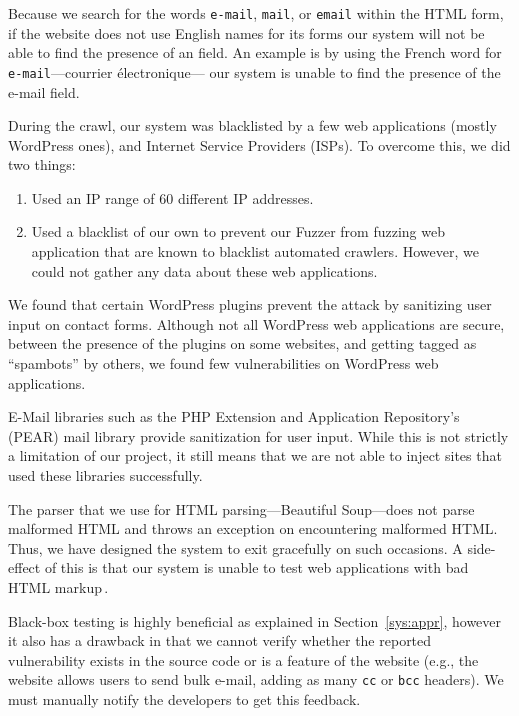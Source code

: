         Because we search for the words \texttt{e-mail}, \texttt{mail}, or \texttt{email} within the HTML form, if the website does not use English names for its forms our system will not be able to find the presence of an \email field. An example is by using the French word for \texttt{e-mail}---courrier {{\'e}}lectronique--- our system is unable to find the presence of the e-mail field. 
        
		During the crawl, our system was blacklisted by a few web applications (mostly WordPress ones), and Internet Service Providers (ISPs).
		To overcome this, we did two things:
		\begin{enumerate}
			\item Used an IP range of 60 different IP addresses.
			\item Used a blacklist of our own to prevent our Fuzzer from fuzzing web application that are known to blacklist automated crawlers.  However, we could not gather any data about these web applications.
		\end{enumerate}

		We found that certain WordPress plugins prevent the \ehi attack by sanitizing user input on contact forms. Although not all  WordPress web applications are secure, between the presence of the plugins on some websites, and getting tagged as ``spambots'' by others, we found few vulnerabilities on WordPress web applications.

        E-Mail libraries such as the PHP Extension and Application Repository's (PEAR) mail library provide sanitization for user input. While this is not strictly a limitation of our project, it still means that we are not able to inject sites that used these libraries successfully.

        The parser that we use for HTML parsing---Beautiful Soup---does not parse malformed HTML and throws an exception on encountering malformed HTML. Thus, we have designed the system to exit gracefully on such occasions. A side-effect of this is that our system is unable to test web applications with bad HTML markup\,\footnotemark.


        Black-box testing is highly beneficial as explained in Section~\ref{sys:appr}, however it also has a drawback in that we cannot verify whether the reported vulnerability exists in the source code or is a feature of the website (e.g., the website allows users to send bulk e-mail, adding as many \texttt{cc} or \texttt{bcc} headers). We must manually notify the developers to get this feedback.

